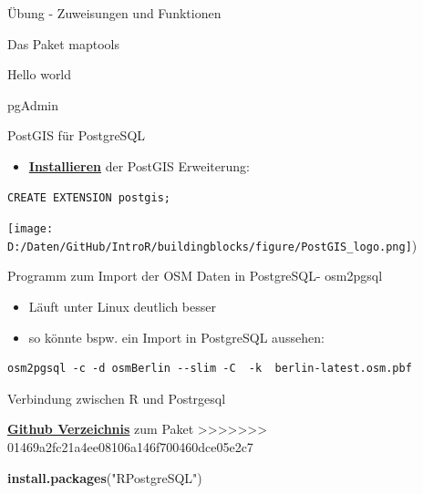 \documentclass[ignorenonframetext,]{beamer}
\newenvironment{Shaded}{\begin{snugshade}}{\end{snugshade}}
\newcommand{\KeywordTok}[1]{\textcolor[rgb]{0.26,0.66,0.93}{\textbf{#1}}}
\newcommand{\NormalTok}[1]{\textcolor[rgb]{0.74,0.68,0.62}{#1}}
\newcommand{\StringTok}[1]{\textcolor[rgb]{0.02,0.61,0.04}{#1}}
\providecommand{\tightlist}{%
  \setlength{\itemsep}{0pt}\setlength{\parskip}{0pt}}
\begin{document}
\begin{frame}[fragile]{Übung - Zuweisungen und Funktionen}
\begin{frame}[fragile]{Das Paket maptools}
\begin{frame}[fragile]{Hello world}
\begin{frame}{pgAdmin}
\end{frame}

\begin{frame}[fragile]{PostGIS für PostgreSQL}

\begin{itemize}
\tightlist
\item
  \href{http://postgis.net/install/}{\textbf{Installieren}} der PostGIS
  Erweiterung:
\end{itemize}

\begin{verbatim}
CREATE EXTENSION postgis;
\end{verbatim}

\texttt{[image: D:/Daten/GitHub/IntroR/buildingblocks/figure/PostGIS\_logo.png]})

\end{frame}

\begin{frame}[fragile]{Programm zum Import der OSM Daten in PostgreSQL-
osm2pgsql}

\begin{itemize}
\tightlist
\item
  Läuft unter Linux deutlich besser
\item
  so könnte bspw. ein Import in PostgreSQL aussehen:
\end{itemize}

\begin{verbatim}
osm2pgsql -c -d osmBerlin --slim -C  -k  berlin-latest.osm.pbf
\end{verbatim}

\end{frame}

\begin{frame}[fragile]{Verbindung zwischen R und Postrgesql}

\begin{block}{\href{https://github.com/tomoakin/RPostgreSQL}{\textbf{Github
Verzeichnis}} zum Paket}
>>>>>>> 01469a2fc21a4ee08106a146f700460dce05e2c7

\begin{Shaded}
\begin{Highlighting}[]
\KeywordTok{install.packages}\NormalTok{(}\StringTok{"RPostgreSQL"}\NormalTok{)}
\end{Highlighting}
\end{Shaded}


\end{block}
\end{frame}
\end{frame}
\end{frame}
\end{frame}
\end{document}
